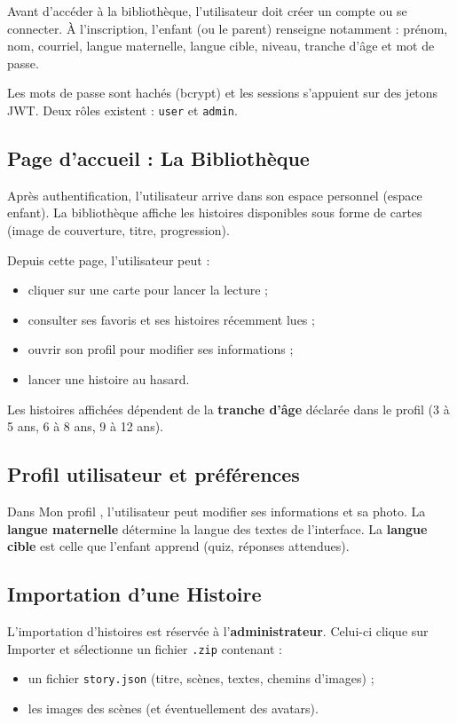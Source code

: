 \documentclass[12pt,twoside,letterpaper]{article}
\begin{document}
Avant d'acc\'eder \`a la biblioth\`eque, l'utilisateur doit cr\'eer un compte
ou se connecter.
\`A l'inscription, l'enfant (ou le parent) renseigne notamment :
pr\'enom, nom, courriel, langue maternelle, langue cible, niveau,
tranche d'\^age et mot de passe.

Les mots de passe sont hach\'es (bcrypt) et les sessions s'appuient sur des jetons JWT.
Deux r\^oles existent : \texttt{user} et \texttt{admin}.

\subsection{Page d'accueil : La Biblioth\`eque}

Apr\`es authentification, l'utilisateur arrive dans son espace personnel (espace enfant).
La biblioth\`eque affiche les histoires disponibles sous forme de cartes
(image de couverture, titre, progression).

Depuis cette page, l'utilisateur peut :
\begin{itemize}[leftmargin=*]
  \item cliquer sur une carte pour lancer la lecture ;
  \item consulter ses favoris et ses histoires r\'ecemment lues ;
  \item ouvrir son profil pour modifier ses informations ;
  \item lancer une histoire au hasard.
\end{itemize}

Les histoires affich\'ees d\'ependent de la \textbf{tranche d'\^age}
d\'eclar\'ee dans le profil (3 \`a 5 ans, 6 \`a 8 ans, 9 \`a 12 ans).

\subsection{Profil utilisateur et pr\'ef\'erences}

Dans \og Mon profil \fg{}, l'utilisateur peut modifier ses informations et sa photo.
La \textbf{langue maternelle} d\'etermine la langue des textes de l'interface.
La \textbf{langue cible} est celle que l'enfant apprend (quiz, r\'eponses attendues).

\subsection{Importation d'une Histoire}

L'importation d'histoires est r\'eserv\'ee \`a l'\textbf{administrateur}.
Celui-ci clique sur \og Importer \fg{} et s\'electionne un fichier \texttt{.zip} contenant :
\begin{itemize}[leftmargin=*]
  \item un fichier \texttt{story.json} (titre, sc\`enes, textes, chemins d'images) ;
  \item les images des sc\`enes (et \'eventuellement des avatars).
\end{itemize}
\end{document}
